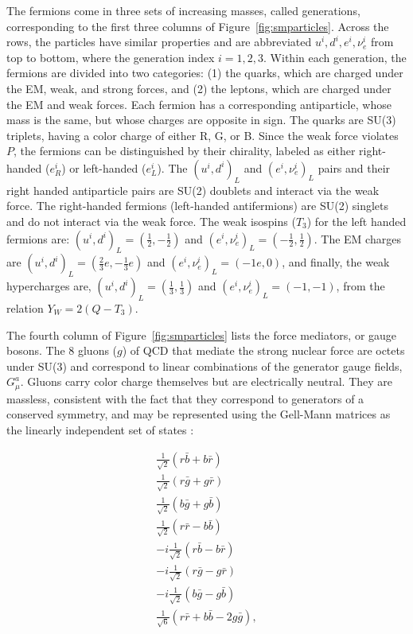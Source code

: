 \indent The fermions come in three sets of increasing masses, called generations, corresponding to the first three columns of Figure~\ref{fig:smparticles}. Across the rows, the particles have similar properties and are abbreviated $u^i, d^i, e^i, \nu_e^i$ from top to bottom, where the generation index $i=1,2,3$. Within each generation, the fermions are divided into two categories: (1) the quarks, which are charged under the EM, weak, and strong forces, and (2) the leptons, which are charged under the EM and weak forces. Each fermion has a corresponding antiparticle, whose mass is the same, but whose charges are opposite in sign. The quarks are SU(3) triplets, having a color charge of either R, G, or B. Since the weak force violates $P$, the fermions can be distinguished by their chirality, labeled as either right-handed ($e^i_R$) or left-handed ($e^i_L$). The $(u^i, d^i)_L$ and $(e^i, \nu_e^i)_L$ pairs and their right handed antiparticle pairs are SU(2) doublets and interact via the weak force. The right-handed fermions (left-handed antifermions) are SU(2) singlets and do not interact via the weak force. The weak isospins ($T_3$) for the left handed fermions are: $(u^i, d^i)_L = (\frac{1}{2}, -\frac{1}{2})$ and $(e^i, \nu_e^i)_L = (-\frac{1}{2}, \frac{1}{2})$. The EM charges are $(u^i, d^i)_L = (\frac{2}{3}e, -\frac{1}{3}e)$ and $(e^i, \nu_e^i)_L = (-1e, 0)$, and finally, the weak hypercharges are, $(u^i, d^i)_L = (\frac{1}{3}, \frac{1}{3})$ and $(e^i, \nu_e^i)_L = (-1, -1)$, from the relation $Y_W = 2(Q-T_3)$.

\indent The fourth column of Figure~\ref{fig:smparticles} lists the force mediators, or gauge bosons. The 8 gluons ($g$) of QCD that mediate the strong nuclear force are octets under SU(3) and correspond to linear combinations of the generator gauge fields, $G^a_\mu$. Gluons carry color charge themselves but are electrically neutral. They are massless, consistent with the fact that they correspond to generators of a conserved symmetry, and may be represented using the Gell-Mann matrices as the linearly independent set of states \cite{Griffithsqm}:

\begin{equation}
\begin{split}
\frac{1}{\sqrt{2}}(r\bar{b} + b\bar{r}) \\
\frac{1}{\sqrt{2}}(r\bar{g} + g\bar{r}) \\
\frac{1}{\sqrt{2}}(b\bar{g} + g\bar{b}) \\
\frac{1}{\sqrt{2}}(r\bar{r} - b\bar{b}) \\
-i \frac{1}{\sqrt{2}}(r\bar{b} - b\bar{r}) \\
-i \frac{1}{\sqrt{2}}(r\bar{g} - g\bar{r}) \\
-i \frac{1}{\sqrt{2}}(b\bar{g} - g\bar{b}) \\
\frac{1}{\sqrt{6}}(r\bar{r} + b\bar{b} -2g\bar{g}),
\end{split}
\end{equation}

